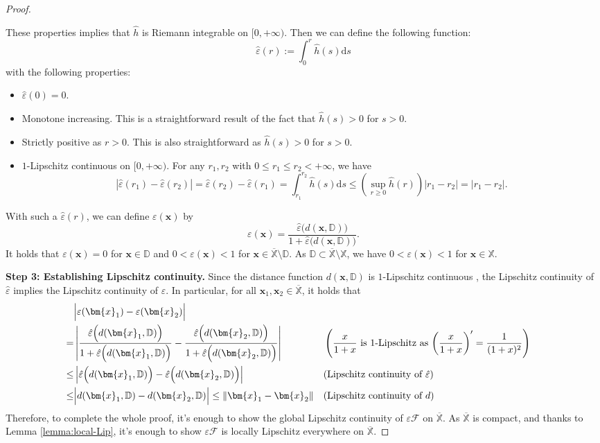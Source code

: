 \documentclass{amsart} %
\def\vx{{\bm{x}}}
\def\sD{{\mathbb{D}}}
\def\sX{{\mathbb{X}}}
\def\cF{{\mathcal{F}}}
\theoremstyle{definition}
\theoremstyle{remark}
\begin{document}
\begin{proof}
\begin{itemize}[leftmargin=5mm]
    \end{itemize}
    These properties implies that $\hat{h}$ is Riemann integrable on $[0,+\infty)$. Then we can define the following function: 
   \[ \hat{\varepsilon}(r) := \int_{0}^r \hat{h}(s) \mathrm{d}s \]
    with the following properties:
    \begin{itemize}[leftmargin=5mm]
        \item $\hat{\varepsilon}(0)=0$.
        \item Monotone increasing. This is a straightforward result of the fact that $\hat{h}(s) > 0$ for $s > 0$.
        \item Strictly positive as $r>0$. This is also straightforward as $\hat{h}(s) > 0$ for $s > 0$.
        \item $1$-Lipschitz continuous on $[0,+\infty)$. For any $r_1,r_2$ with $0 \leq r_1 \leq r_2 < +\infty$, we have
        \[ | \hat{\varepsilon}(r_1) - \hat{\varepsilon}(r_2) | = \hat{\varepsilon}(r_2) - \hat{\varepsilon}(r_1) = \int_{r_1}^{r_2} \hat{h}(s)\mathrm{d}s \leq \left( \sup_{r \geq 0} \hat{h}(r) \right) |r_1 - r_2| = |r_1 - r_2|. \]
    \end{itemize}
With such a $\hat{\varepsilon}(r)$, we can define $\varepsilon(\vx)$ by
\[ \varepsilon(\vx) = \frac{\hat{\varepsilon} \Big( d(\vx,\sD) \Big)}{1+\hat{\varepsilon} \Big( d(\vx,\sD) \Big)} . \]
It holds that $\varepsilon(\vx)=0$ for $\vx \in \sD$ and $0 < \varepsilon(\vx) < 1$ for $\vx \in \overline{\sX} \setminus \sD$. As $\sD \subset \overline{\sX}\setminus\sX$, we have $0 < \varepsilon(\vx) < 1$ for $\vx \in \sX$.

\textbf{Step 3: Establishing Lipschitz continuity.} Since the distance function $d(\vx,\sD)$ is $1$-Lipschitz continuous \cite[Theorem 4.8 (1)]{federer1959curvature}, the Lipschitz continuity of $\hat{\varepsilon}$ implies the Lipschitz continuity of $\varepsilon$. In particular, for all $\vx_1,\vx_2 \in \overline{\sX}$, it holds that
\begin{align*}
& \Big|\varepsilon(\vx_1) - \varepsilon(\vx_2)\Big| \\
= & \left| \frac{\hat{\varepsilon} \Big( d(\vx_1,\sD) \Big)}{1+\hat{\varepsilon} \Big( d(\vx_1,\sD) \Big)} - \frac{\hat{\varepsilon} \Big( d(\vx_2,\sD) \Big)}{1+\hat{\varepsilon} \Big( d(\vx_2,\sD) \Big)} \right| && \left(\textup{$\frac{x}{1+x}$ is 1-Lipschitz as $\left(\frac{x}{1+x}\right)^\prime=\frac{1}{(1+x)^2}$}\right) \\
\leq & \left| \hat{\varepsilon} \Big( d(\vx_1,\sD) \Big) - \hat{\varepsilon} \Big( d(\vx_2,\sD) \Big) \right| && (\textup{Lipschitz continuity of $\hat{\varepsilon}$}) \\
\leq & \Big|  d(\vx_1,\sD) - d(\vx_2,\sD) \Big| \leq \|\vx_1 - \vx_2\|  && (\textup{Lipschitz continuity of $d$})
\end{align*}
Therefore, to complete the whole proof, it's enough to show the global Lipschitz continuity of $\varepsilon \cF$ on $\overline{\sX}$. As $\overline{\sX}$ is compact, and thanks to Lemma \ref{lemma:local-Lip}, it's enough to show $\varepsilon \cF$ is locally Lipschitz everywhere on $\overline{\sX}$. 


\end{proof}
\end{document}
